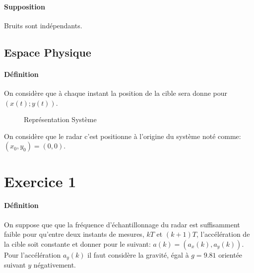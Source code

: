 \documentclass{article}
\begin{document}
\paragraph{Supposition}Bruits sont indépendants.

\subsection*{Espace Physique}
\paragraph{Définition}On considère que à chaque instant la position de la cible sera donne pour $(x(t);y(t))$.

\begin{figure}[H]
    \centering
    \caption{Représentation Système}
\end{figure}
\noindent On considère que le radar c'est positionne à l'origine du système noté comme: $(x_{0}, y_{0}) = (0, 0)$.



\section{Exercice 1}
\paragraph{Définition}On suppose que que la fréquence d'échantillonnage du radar est suffisamment faible pour qu'entre deux instants de mesures, $kT$ et $(k+1)T$, l'accélération de la cible soit constante et donner pour le suivant: $a(k) = (a_{x}(k), a_{y}(k))$. Pour l'accélération $a_{y}(k)$ il faut considère la gravité, égal à $g = 9.81$ orientée suivant $y$ négativement.
\end{document}
